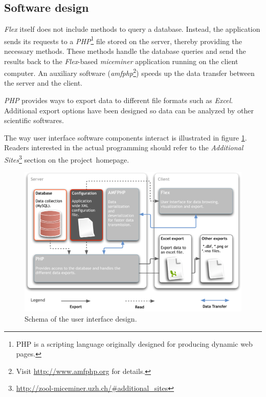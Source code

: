 \subsection{Software design}
\label{subsec:miceminer_design}   

\textit{Flex} itself does not include methods to query a database. Instead, the application sends its requests to a \textit{PHP}\footnote{PHP is a scripting language originally designed for producing dynamic web pages\citep{wiki:php}.} file stored on the server, thereby providing the necessary methods. These methods handle the database queries and send the results back to the \textit{Flex}-based \textit{miceminer} application running on the client computer. An auxiliary software (\textit{amfphp}\footnote{Visit \href{http://www.amfphp.org}{http://www.amfphp.org} for details.}) speeds up the data transfer between the server and the client.

\textit{PHP} provides ways to export data to different file formats such as \textit{Excel}. Additional export options have been designed so data can be analyzed by other scientific softwares.

The way user interface software components interact is illustrated in figure \ref{fig:app_design_miceminer}. Readers interested in the actual programming should refer to the \textit{Additional Sites}\footnote{\href{http://zool-miceminer.uzh.ch/\#additional_sites}{http://zool-miceminer.uzh.ch/\#additional\_sites}} section on the project~homepage.   

\begin{figure}[htpb]
\begin{center}
  \includegraphics[width=\textwidth]{assets/pdf/application_design_miceminer.pdf}
  \caption[Schema of the user interface design]{Schema of the user interface design.}
  \label{fig:app_design_miceminer}
\end{center}
\end{figure}

